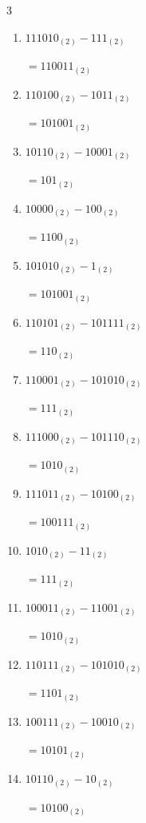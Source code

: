\begin{multicols}{3}
\begin{enumerate}
        $=10001_{(2)}$

  \item $111010_{(2)} - 111_{(2)}$

        $=110011_{(2)}$

  \item $110100_{(2)} - 1011_{(2)}$

        $=101001_{(2)}$

  \item $10110_{(2)} - 10001_{(2)}$

        $=101_{(2)}$

  \item $10000_{(2)} - 100_{(2)}$

        $=1100_{(2)}$

  \item $101010_{(2)} - 1_{(2)}$

        $=101001_{(2)}$

  \item $110101_{(2)} - 101111_{(2)}$

        $=110_{(2)}$

  \item $110001_{(2)} - 101010_{(2)}$

        $=111_{(2)}$

  \item $111000_{(2)} - 101110_{(2)}$

        $=1010_{(2)}$

  \item $111011_{(2)} - 10100_{(2)}$

        $=100111_{(2)}$

\columnbreak %

  \item $1010_{(2)} - 11_{(2)}$

        $=111_{(2)}$

  \item $100011_{(2)} - 11001_{(2)}$

        $=1010_{(2)}$

  \item $110111_{(2)} - 101010_{(2)}$

        $=1101_{(2)}$

  \item $100111_{(2)} - 10010_{(2)}$

        $=10101_{(2)}$

  \item $10110_{(2)} - 10_{(2)}$

        $=10100_{(2)}$


\end{enumerate}
\end{multicols}
